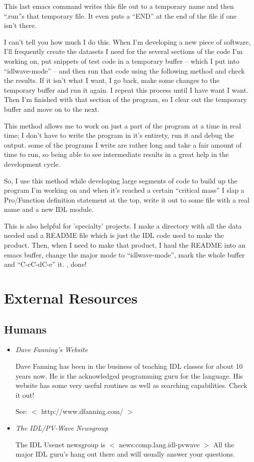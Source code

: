   This last emacs command writes this file out to a temporary name and
  then ``.run''s that temporary file. It even puts a ``END'' at the
  end of the file if one isn't there.

  
  I can't tell you how much I do this. When I'm developing a new piece
  of software, I'll frequently create the datasets I need for the
  several sections of the code I'm working on, put snippets of test
  code in a temporary buffer -- which I put into ``idlwave-mode'' --
  and then run that code using the following method and check the
  results. If it isn't what I want, I go back, make some changes to
  the temporary buffer and run it again. I repeat this process until I
  have want I want. Then I'm finished with that section of the
  program, so I clear out the temporary buffer and move on to the
  next.

  This method allows me to work on just a part of the program at a
  time in real time; I don't have to write the program in it's
  entirety, run it and debug the output. some of the programs I write
  are rather long and take a fair amount of time to run, so being able
  to see intermediate results in a great help in the development cycle.

  So, I use this method while developing large segments of code to build
  up the program I'm working on and when it's reached a certain
  ``critical mass'' I slap a Pro/Function definition statement at the
  top, write it out to some file with a real name and  a
  new IDL module.


  This is also helpful for 'specialty' projects. I make a directory
  with all the data needed and a README file which is just the IDL
  code used to make the product. Then, when I need to make that
  product, I haul the README into an emacs buffer, change the major
  mode to ``idlwave-mode'', mark the whole buffer and ``C-cC-dC-e''
  it. , done!

\section{External Resources}\label{sec:qs-resources}

\subsection{Humans}\label{sec:qs-humans}
\begin{itemize}
  \item \textit{Dave Fanning's Website}
 
   Dave Fanning has been in the business of teaching IDL classes for
  about 10 years now. He is the acknowledged programming guru for the
  language. His website has some very useful routines as well as
  searching capabilities. Check it out!

   See: $<$ http://www.dfanning.com/ $>$

  \item \textit{The IDL/PV-Wave Newsgroup}

   The IDL Usenet newsgroup is $<$ news:comp.lang.idl-pvwave $>$ All the
  major IDL guru's hang out there and will usually answer your
  questions.


\end{itemize}
